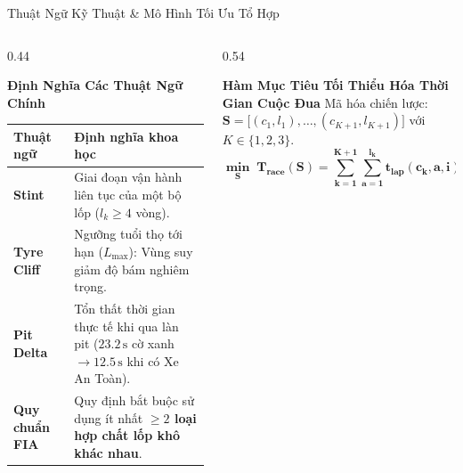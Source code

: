 \documentclass[aspectratio=169, 10pt]{beamer}
\begin{document}
\begin{frame}{Thuật Ngữ Kỹ Thuật \& Mô Hình Tối Ưu Tổ Hợp}
  \begin{columns}[T]
    \begin{column}{0.44\textwidth}
      \begin{block}{\textbf{Định Nghĩa Các Thuật Ngữ Chính}}
        \scriptsize
        \renewcommand{\arraystretch}{1.2}
        \begin{tabularx}{\linewidth}{p{1.9cm}X}
          \toprule
          \textbf{Thuật ngữ} & \textbf{Định nghĩa khoa học} \\
          \midrule
          \textbf{Stint} & Giai đoạn vận hành liên tục của một bộ lốp ($l_k \ge 4$ vòng). \\
          \textbf{Tyre Cliff} & Ngưỡng tuổi thọ tới hạn ($L_{\max}$): Vùng suy giảm độ bám nghiêm trọng. \\
          \textbf{Pit Delta} & Tổn thất thời gian thực tế khi qua làn pit ($23.2\,\text{s}$ cờ xanh $\to 12.5\,\text{s}$ khi có Xe An Toàn). \\
          \textbf{Quy chuẩn FIA} & Quy định bắt buộc sử dụng ít nhất \textbf{$\ge 2$ loại hợp chất lốp khô khác nhau}. \\
          \bottomrule
        \end{tabularx}
      \end{block}
    \end{column}

    \begin{column}{0.54\textwidth}
      \begin{alertblock}{\textbf{Hàm Mục Tiêu Tối Thiểu Hóa Thời Gian Cuộc Đua}}
        \scriptsize
        Mã hóa chiến lược: $\mathbf{S} = \big[ (c_1, l_1), \dots, (c_{K+1}, l_{K+1}) \big]$ với $K \in \{1, 2, 3\}$.
        \[
          \mathbf{\min_{\mathbf{S}} \; T_{\text{race}}(\mathbf{S}) = \sum_{k=1}^{K+1} \sum_{a=1}^{l_k} t_{\text{lap}}(c_k, a, i) + K \cdot T_{\text{pit}}}
        \]
      \end{alertblock}


\end{column}
\end{columns}
\end{frame}
\end{document}
